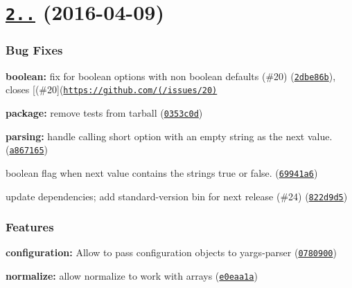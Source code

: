 \label{_2.3.0}%
 \section*{\href{https://github.com/yargs/yargs-parser/compare/v2.2.0...v2.3.0}{\tt 2..} (2016-\/04-\/09)}

\subsubsection*{Bug Fixes}


\begin{DoxyItemize}
\item {\bfseries boolean\+:} fix for boolean options with non boolean defaults (\#20) (\href{https://github.com/yargs/yargs-parser/commit/2dbe86b}{\tt 2dbe86b}), closes \mbox{[}(\#20\mbox{]}(\href{https://github.com/(/issues/20)}{\tt https\+://github.\+com/(/issues/20)}
\item {\bfseries package\+:} remove tests from tarball (\href{https://github.com/yargs/yargs-parser/commit/0353c0d}{\tt 0353c0d})
\item {\bfseries parsing\+:} handle calling short option with an empty string as the next value. (\href{https://github.com/yargs/yargs-parser/commit/a867165}{\tt a867165})
\item boolean flag when next value contains the strings \textquotesingle{}true\textquotesingle{} or \textquotesingle{}false\textquotesingle{}. (\href{https://github.com/yargs/yargs-parser/commit/69941a6}{\tt 69941a6})
\item update dependencies; add standard-\/version bin for next release (\#24) (\href{https://github.com/yargs/yargs-parser/commit/822d9d5}{\tt 822d9d5})
\end{DoxyItemize}

\subsubsection*{Features}


\begin{DoxyItemize}
\item {\bfseries configuration\+:} Allow to pass configuration objects to yargs-\/parser (\href{https://github.com/yargs/yargs-parser/commit/0780900}{\tt 0780900})
\item {\bfseries normalize\+:} allow normalize to work with arrays (\href{https://github.com/yargs/yargs-parser/commit/e0eaa1a}{\tt e0eaa1a}) 
\end{DoxyItemize}